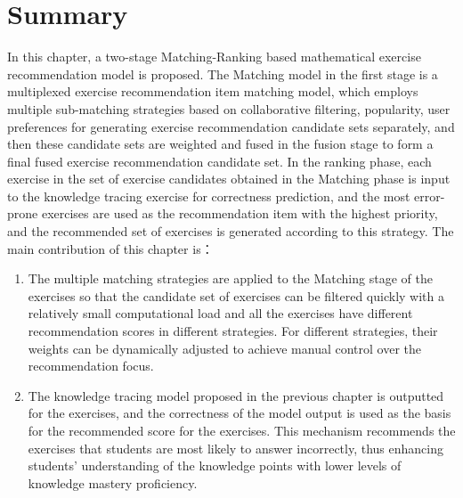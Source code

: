 \section{Summary}

In this chapter, a two-stage Matching-Ranking based mathematical exercise recommendation model is proposed. The Matching model in the first stage is a multiplexed exercise recommendation item matching model, which employs multiple sub-matching strategies based on collaborative filtering, popularity, user preferences for generating exercise recommendation candidate sets separately, and then these candidate sets are weighted and fused in the fusion stage to form a final fused exercise recommendation candidate set. In the ranking phase, each exercise in the set of exercise candidates obtained in the Matching phase is input to the knowledge tracing exercise for correctness prediction, and the most error-prone exercises are used as the recommendation item with the highest priority, and the recommended set of exercises is generated according to this strategy.
The main contribution of this chapter is：
\begin{enumerate}
    \item The multiple matching strategies are applied to the Matching stage of the exercises so that the candidate set of exercises can be filtered quickly with a relatively small computational load and all the exercises have different recommendation scores in different strategies. For different strategies, their weights can be dynamically adjusted to achieve manual control over the recommendation focus.
    \item The knowledge tracing model proposed in the previous chapter is outputted for the exercises, and the correctness of the model output is used as the basis for the recommended score for the exercises. This mechanism recommends the exercises that students are most likely to answer incorrectly, thus enhancing students' understanding of the knowledge points with lower levels of knowledge mastery proficiency.
\end{enumerate}